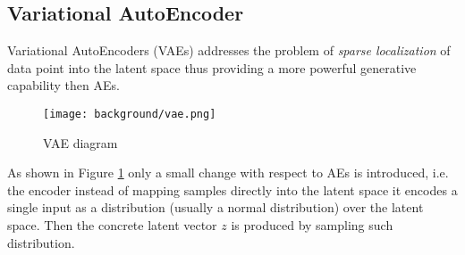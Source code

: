 



\subsection{Variational AutoEncoder}

Variational AutoEncoders (VAEs) addresses the problem of \textit{sparse localization} of data point into the latent space thus providing a more powerful generative capability then AEs.

\begin{figure}[h]
  \begin{center}
    \texttt{[image: background/vae.png]}
  \end{center}
  \caption{VAE diagram}
  \label{fig:vae}
\end{figure}

As shown in Figure \ref{fig:vae} only a small change with respect to AEs is introduced, i.e. the encoder instead of mapping samples directly into the latent space it encodes a single input as a distribution (usually a normal distribution) over the latent space. Then the concrete latent vector $z$ is produced by sampling such distribution. 

